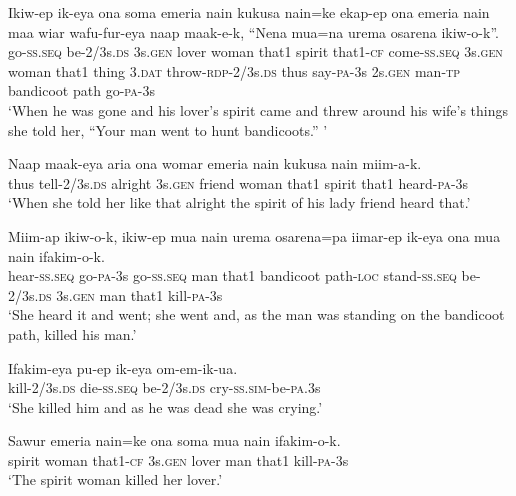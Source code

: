 {\ea\label{ex:a:x3}
\gll  Ikiw-ep  ik-eya  ona  soma  emeria  nain  kukusa  nain=ke        ekap-ep  ona  emeria  nain  maa  wiar  wafu-fur-eya                 naap  maak-e-k,  “Nena  mua=na  urema  osarena  ikiw-o-k”. \\
go-\textsc{ss.seq}  be-2/3s.\textsc{ds}  3s.\textsc{gen}  lover  woman  that1  spirit  that1-\textsc{cf}   come-\textsc{ss.seq}  3s.\textsc{gen}  woman  that1  thing  3.\textsc{dat}  throw-\textsc{rdp}-2/3s.\textsc{ds}  thus  say-\textsc{pa}-3s  2s.\textsc{gen}  man-\textsc{tp}  bandicoot  path  go-\textsc{pa}-3s \\




\glt ‘When he was gone and his lover’s spirit came and threw around his wife’s things she told her, “Your man went to hunt bandicoots.” ’ \\
\z


\ea\label{ex:a:x4}
\gll  Naap  maak-eya  aria  ona  womar  emeria  nain  kukusa  nain  miim-a-k. \\
thus  tell-2/3s.\textsc{ds}  alright  3s.\textsc{gen}  friend  woman  that1  spirit  that1  heard-\textsc{pa}-3s \\
\glt ‘When she told her like that alright the spirit of his lady friend heard that.’ \\
\z


\ea\label{ex:a:x5}
\gll  Miim-ap  ikiw-o-k,  ikiw-ep  mua  nain  urema  osarena=pa    iimar-ep  ik-eya  ona  mua  nain  ifakim-o-k. \\
hear-\textsc{ss.seq}  go-\textsc{pa}-3s  go-\textsc{ss.seq}  man  that1  bandicoot  path-\textsc{loc}  stand-\textsc{ss.seq}  be-2/3s.\textsc{ds}  3s.\textsc{gen}  man  that1  kill-\textsc{pa}-3s \\


\glt ‘She heard it and went; she went and, as the man was standing on the bandicoot path, killed his man.’ \\
\z


\ea\label{ex:a:x6}
\gll  Ifakim-eya  pu-ep  ik-eya  om-em-ik-ua. \\
kill-2/3s.\textsc{ds}  die-\textsc{ss.seq}  be-2/3s.\textsc{ds}  cry-\textsc{ss}.\textsc{sim}-be-\textsc{pa}.3s \\
\glt ‘She killed him and as he was dead she was crying.’ \\
\z


\ea\label{ex:a:x7}
\gll  Sawur  emeria  nain=ke  ona  soma  mua  nain  ifakim-o-k. \\
spirit  woman  that1-\textsc{cf}  3s.\textsc{gen}  lover  man  that1  kill-\textsc{pa}-3s \\
\glt ‘The spirit woman killed her lover.’ \\
\z


}
